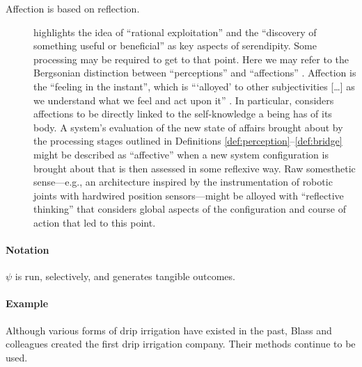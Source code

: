  \begin{description}                      
 \item[Affection is based on reflection.]
 \citet{campbell2005serendipity} highlights the idea of ``rational
 exploitation'' and the ``discovery of something useful or
 beneficial'' as key aspects of serendipity.
 Some processing may be required
 to get to that point. Here we may refer to the Bergsonian
 distinction
 between ``perceptions'' and ``affections''
 \cite[p.~23]{deleuze1991bergsonism}.
 Affection is the ``feeling in the instant'', which is {``}`alloyed'
 to other subjectivities [\ldots] as we understand what we feel and
 act upon it'' \cite[p.~141]{sutton2008deleuze}.
 In particular,
 \citet[p.~17]{bergson1991matter} considers affections to be directly
 linked to the self-knowledge a being has of its body.  A system's
 evaluation of the new state of affairs brought about by the processing
 stages outlined in Definitions \ref{def:perception}--\ref{def:bridge}
 might be described as ``affective''
 when a new system configuration is brought about that is then assessed
 in some reflexive way.  Raw somesthetic sense---e.g., an architecture inspired by
 the instrumentation of robotic joints with hardwired position
 sensors---might be alloyed with ``reflective thinking'' \cite{singh2005architecture}
 that considers global aspects of the configuration and course of action
 that led to this point.
 \end{description}                        

 \paragraph{\textbf{\upshape Notation}}

 $\psi$ is run, selectively, and generates tangible outcomes.

 \paragraph{\textbf{\upshape Example}}
 Although various forms of drip irrigation have existed in the past,
 Blass and colleagues created the first drip irrigation company.  Their
 methods continue to be used.

